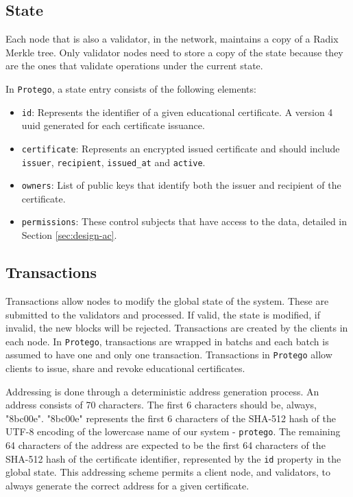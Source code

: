 \subsection{State}
\label{sec:design-state}

Each node that is also a validator, in the network, maintains a copy of a Radix Merkle tree. Only validator nodes need to store a copy of the state because they are the ones that validate operations under the current state.

In \texttt{Protego}, a state entry consists of the following elements:

\begin{itemize}
	\item \texttt{id}: Represents the identifier of a given educational certificate. A version 4 \gls{uuid} generated for each certificate issuance.
	\item \texttt{certificate}: Represents an encrypted issued certificate and should include \texttt{issuer}, \texttt{recipient}, \texttt{issued\_at} and \texttt{active}.
	\item \texttt{owners}: List of public keys that identify both the issuer and recipient of the certificate.
	\item \texttt{permissions}: These control subjects that have access to the data, detailed in Section \ref{sec:design-ac}.
\end{itemize}

\subsection{Transactions}
\label{sec:design-transactions}

Transactions allow nodes to modify the global state of the system. These are submitted to the validators and processed. If valid, the state is modified, if invalid, the new blocks will be rejected. Transactions are created by the clients in each node. In \texttt{Protego}, transactions are wrapped in batchs and each batch is assumed to have one and only one transaction. Transactions in \texttt{Protego} allow clients to issue, share and revoke educational certificates.

Addressing is done through a deterministic address generation process. An address consists of 70 characters. The first 6 characters should be, always, "8bc00e". "8bc00e" represents the first 6 characters of the SHA-512 hash of the UTF-8 encoding of the lowercase name of our system - \texttt{protego}. The remaining 64 characters of the address are expected to be the first 64 characters of the SHA-512 hash of the certificate identifier, represented by the \texttt{id} property in the global state. This addressing scheme permits a client node, and validators, to always generate the correct address for a given certificate.

